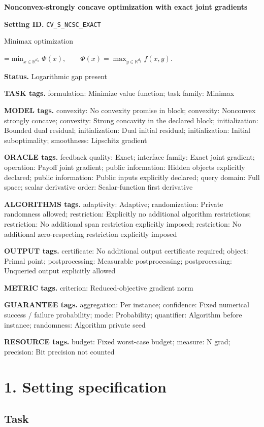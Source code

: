 \documentclass[10pt,a4paper]{article}
\newcommand{\AtlasMath}[1]{\par\begingroup\centering\setbox0=\hbox{$\displaystyle #1$}\ifdim\wd0>1.4\linewidth\typeout{ATLAS WIDE FORMULA: \the\wd0}\fi\ifdim\wd0>\linewidth\resizebox{\linewidth}{!}{\box0}\else\box0\fi\par\endgroup}
\begin{document}
\raggedright

{\LARGE\bfseries\sffamily\color{AtlasNavy} Nonconvex-strongly concave optimization with exact joint gradients\par}\vspace{5pt}
\textbf{Setting ID.} \texttt{CV\_\allowbreak{}S\_\allowbreak{}NCSC\_\allowbreak{}EXACT}

Minimax optimization


\AtlasMath{\min_{x\in\mathbb{R}^{d_x}}\Phi(x),\qquad\Phi(x)=\max_{y\in\mathbb{R}^{d_y}}f(x,y).}


\textbf{Status.} Logarithmic gap present

\textbf{TASK tags.} formulation: Minimize value function; task family: Minimax

\textbf{MODEL tags.} convexity: No convexity promise in block; convexity: Nonconvex strongly concave; convexity: Strong concavity in the declared block; initialization: Bounded dual residual; initialization: Dual initial residual; initialization: Initial suboptimality; smoothness: Lipschitz gradient

\textbf{ORACLE tags.} feedback quality: Exact; interface family: Exact joint gradient; operation: Payoff joint gradient; public information: Hidden objects explicitly declared; public information: Public inputs explicitly declared; query domain: Full space; scalar derivative order: Scalar-function first derivative

\textbf{ALGORITHMS tags.} adaptivity: Adaptive; randomization: Private randomness allowed; restriction: Explicitly no additional algorithm restrictions; restriction: No additional span restriction explicitly imposed; restriction: No additional zero-respecting restriction explicitly imposed

\textbf{OUTPUT tags.} certificate: No additional output certificate required; object: Primal point; postprocessing: Measurable postprocessing; postprocessing: Unqueried output explicitly allowed

\textbf{METRIC tags.} criterion: Reduced-objective gradient norm

\textbf{GUARANTEE tags.} aggregation: Per instance; confidence: Fixed numerical success / failure probability; mode: Probability; quantifier: Algorithm before instance; randomness: Algorithm private seed

\textbf{RESOURCE tags.} budget: Fixed worst-case budget; measure: N grad; precision: Bit precision not counted

\section{1. Setting specification}
\subsection{Task}
\end{document}
